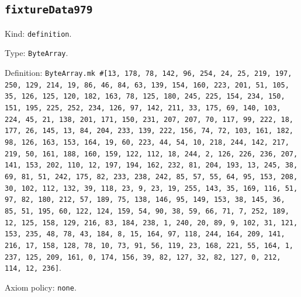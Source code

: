 \documentclass[11pt]{article}
\begin{document}
\subsection*{\texttt{fixtureData979}}
\noindent Kind: \texttt{definition}.\par
\noindent Type: \texttt{ByteArray}.\par
\noindent Definition: \texttt{ByteArray.mk \#[13, 178, 78, 142, 96, 254, 24, 25, 219, 197, 250, 129, 214, 19, 86, 46, 84, 63, 139, 154, 160, 223, 201, 51, 105, 35, 126, 125, 120, 182, 163, 78, 125, 180, 245, 225, 154, 234, 150, 151, 195, 225, 252, 234, 126, 97, 142, 211, 33, 175, 69, 140, 103, 224, 45, 21, 138, 201, 171, 150, 231, 207, 207, 70, 117, 99, 222, 18, 177, 26, 145, 13, 84, 204, 233, 139, 222, 156, 74, 72, 103, 161, 182, 98, 126, 163, 153, 164, 19, 60, 223, 44, 54, 10, 218, 244, 142, 217, 219, 50, 161, 188, 160, 159, 122, 112, 18, 244, 2, 126, 226, 236, 207, 141, 153, 202, 110, 12, 197, 194, 162, 232, 81, 204, 193, 13, 245, 38, 69, 81, 51, 242, 175, 82, 233, 238, 242, 85, 57, 55, 64, 95, 153, 208, 30, 102, 112, 132, 39, 118, 23, 9, 23, 19, 255, 143, 35, 169, 116, 51, 97, 82, 180, 212, 57, 189, 75, 138, 146, 95, 149, 153, 38, 145, 36, 85, 51, 195, 60, 122, 124, 159, 54, 90, 38, 59, 66, 71, 7, 252, 189, 12, 125, 158, 129, 216, 83, 184, 238, 1, 240, 20, 89, 9, 102, 31, 121, 153, 235, 48, 78, 43, 184, 8, 15, 164, 97, 118, 244, 164, 209, 141, 216, 17, 158, 128, 78, 10, 73, 91, 56, 119, 23, 168, 221, 55, 164, 1, 237, 125, 209, 161, 0, 174, 156, 39, 82, 127, 32, 82, 127, 0, 212, 114, 12, 236]}.\par
\noindent Axiom policy: \texttt{none}.\par
\end{document}
